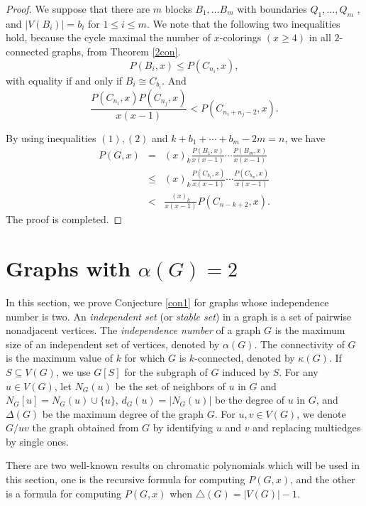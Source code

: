 \documentclass[12pt]{article}
\theoremstyle{definition}
\begin{document}
\begin{proof}
We suppose that there are $m$ blocks $B_1,\ldots B_m$ with boundaries $Q_1,\ldots, Q_m$ , and $|V(B_i)|=b_i$ for $1\leq i\leq m$. We note that the following two inequalities hold, because the cycle maximal the number of $x$-colorings $(x\geq 4)$ in all $2$-connected graphs, from Theorem \ref{2con}.
\begin{equation}
P(B_i, x)\leq P(C_{n_i}, x),
\end{equation} with equality if and only if $B_i\cong C_{b_i}$. And
\begin{equation}
\frac{P(C_{n_i}, x)P(C_{n_j},x)}{x(x-1)}< P(C_{n_i+n_j-2}, x).
\end{equation}

By using inequalities $(1),(2)$ and $k+b_1+\cdots+b_m-2m=n$, we have
\begin{eqnarray*}P(G,x)&=&(x)_k\frac{P(B_1,x)}{x(x-1)}\cdots\frac{P(B_m,x)}{x(x-1)}\\
&\leq &(x)_k\frac{P(C_{b_1},x)}{x(x-1)}\cdots\frac{P(C_{b_m},x)}{x(x-1)}\\
&<&\frac{(x)_k}{x(x-1)}P(C_{n-k+2},x).
\end{eqnarray*}
The proof is completed.
\end{proof}


\section{Graphs with $\alpha(G)=2$}

In this section, we prove Conjecture \ref{con1} for graphs whose independence number is two. An {\it independent set} (or {\it stable set}) in a graph is a set of pairwise nonadjacent vertices.
The {\it independence number} of a graph $G$ is the maximum size of an independent set of vertices, denoted by $\alpha(G)$.
The connectivity of $G$ is the maximum value of $k$ for which $G$ is $k$-connected, denoted by $\kappa(G)$. If $S\subseteq V(G)$, we use $G[S]$ for the subgraph of $G$ induced by $S$. For any $u\in V(G)$, let $N_{G}(u)$ be the set of neighbors of $u$ in $G$ and $N_{G}[u]=N_{G}(u)\cup\{u\}$, $d_{G}(u)=|N_{G}(u)|$ be the degree of $u$ in $G$, and $\Delta (G)$ be the maximum degree of the graph $G$. For $u,v\in V(G)$, we denote $G/uv$ the graph obtained from $G$ by identifying $u$ and $v$ and replacing multiedges by single ones.

There are two well-known results on chromatic polynomials which will be used in this section, one is the recursive formula for computing $P(G,x)$, and the other is a formula for computing $P(G,x)$ when $\triangle (G)=|V(G)|-1$.
\end{document}
